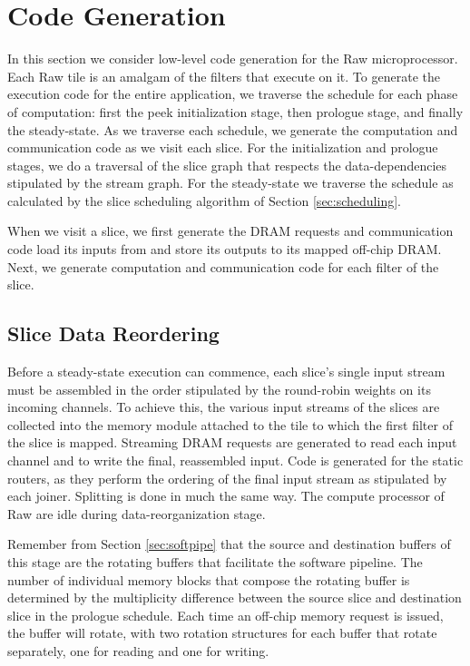 \section{Code Generation}
\label{sec:codegen}
In this section we consider low-level code generation for the Raw
microprocessor. Each Raw tile is an amalgam of the filters that
execute on it. To generate the execution code for the entire
application, we traverse the schedule for each phase of computation:
first the peek initialization stage, then prologue stage, and finally
the steady-state.  As we traverse each schedule, we generate the
computation and communication code as we visit each slice.  For the
initialization and prologue stages, we do a traversal of the slice
graph that respects the data-dependencies stipulated by the stream
graph. For the steady-state we traverse the schedule as calculated by
the slice scheduling algorithm of Section \ref{sec:scheduling}.

When we visit a slice, we first generate the DRAM requests and
communication code load its inputs from and store its outputs to its
mapped off-chip DRAM.  Next, we generate computation and communication
code for each filter of the slice.  

\subsection{Slice Data Reordering}
Before a steady-state execution can commence, each slice's single
input stream must be assembled in the order stipulated by the
round-robin weights on its incoming channels. To achieve this, the
various input streams of the slices are collected into the memory
module attached to the tile to which the first filter of the slice is
mapped. Streaming DRAM requests are generated to read each input
channel and to write the final, reassembled input.  Code is generated
for the static routers, as they perform the ordering of the final
input stream as stipulated by each joiner.  Splitting is done in much
the same way.  The compute processor of Raw are idle during
data-reorganization stage.

Remember from Section \ref{sec:softpipe} that the source and
destination buffers of this stage are the rotating buffers that
facilitate the software pipeline.  The number of individual memory
blocks that compose the rotating buffer is determined by the
multiplicity difference between the source slice and destination slice
in the prologue schedule.  Each time an off-chip memory request is
issued, the buffer will rotate, with two rotation structures for each
buffer that rotate separately, one for reading and one for writing.


